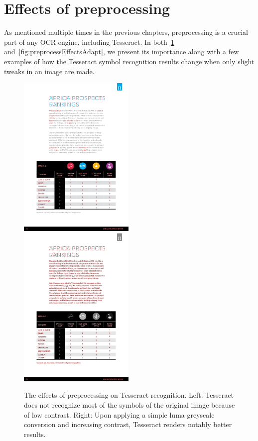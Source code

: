 \section{Effects of preprocessing}

As mentioned multiple times in the previous chapters, preprocessing is a crucial part of any OCR engine, including Tesseract. In both~\cref{fig:preprocessEffectsGS} and~\cref{fig:preprocessEffectsAdapt}, we present its importance along with a few examples of how the Tesseract symbol recognition results change when only slight tweaks in an image are made.

\begin{figure}[t]
\centering

\includegraphics[width=15em]{img/results/im1_noPreproc.png}
\includegraphics[width=15em]{img/results/im1_Preproc.png}

\caption{The effects of preprocessing on Tesseract recognition. Left: Tesseract does not recognize most of the symbols of the original image because of low contrast. Right: Upon applying a simple luma greyscale conversion and increasing contrast, Tesseract renders notably better results.}
\label{fig:preprocessEffectsGS}
\end{figure}

